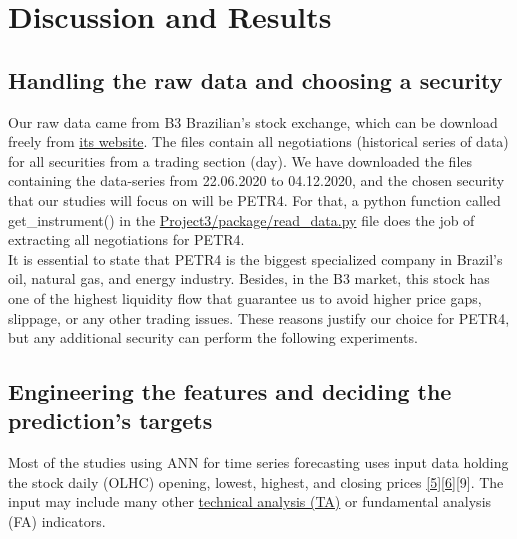 \section{Discussion and Results}
\label{chap:Discussion and Results}

\subsection{Handling the raw data and choosing a security}
\label{chap:Handling the raw data and choosing a security}

\quad Our raw data came from B3 Brazilian's stock exchange, which can be download freely from \href{http://www.b3.com.br/pt_br/market-data-e-indices/servicos-de-dados/market-data/cotacoes/cotacoes/}{its website}. The files contain all negotiations (historical series of data) for all securities from a trading section (day). We have downloaded the files containing the data-series from 22.06.2020 to 04.12.2020, and the chosen security that our studies will focus on will be PETR4. For that, a python function called get\_instrument() in the \href{https://github.com/fabiorodp/UiO-FYS-STK4155/tree/master/Project3/package/read_data.py}{Project3/package/read\_data.py} file does the job of extracting all negotiations for PETR4.\\

It is essential to state that PETR4 is the biggest specialized company in Brazil's oil, natural gas, and energy industry. Besides, in the B3 market, this stock has one of the highest liquidity flow that guarantee us to avoid higher price gaps, slippage, or any other trading issues. These reasons justify our choice for PETR4, but any additional security can perform the following experiments.

\subsection{Engineering the features and deciding the prediction's targets}
\label{chap:Engineering the features and deciding the prediction's targets}

\quad Most of the studies using ANN for time series forecasting uses input data holding the stock daily (OLHC) opening, lowest, highest, and closing prices \hyperref[Bib:Leonardo C. Martinez, Diego N. da Hora, Joao R. de M. Palotti, Wagner Meira Jr. and Gisele L. Pappa]{[5]}\hyperref[Bib:Van-Dai Ta, Chuan-Ming Liu, Direselign Addis Tadesse]{[6]}[9]. The input may include many other \hyperref[chap:Technical Analysis]{technical analysis (TA)} or fundamental analysis (FA) indicators.\\

